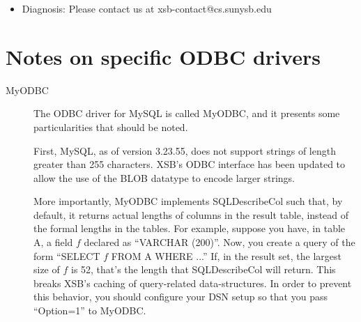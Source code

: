 \begin{description}
\begin{itemize}
\item Diagnosis: Please contact us at xsb-contact@cs.sunysb.edu
\end{itemize}

\section{Notes on specific ODBC drivers}

\begin{description}
\item[MyODBC] The ODBC driver for MySQL is called MyODBC, and it
  presents some particularities that should be noted. 

  First, MySQL, as
  of version 3.23.55, does not support strings of length greater than
  255 characters. XSB's ODBC interface has been updated to allow the
  use of the BLOB datatype to encode larger strings. 
  
  More importantly, MyODBC implements SQLDescribeCol such that, by
  default, it returns actual lengths of columns in the result table,
  instead of the formal lengths in the tables. For example, suppose
  you have, in table A, a field $f$ declared as ``VARCHAR
  (200)''. Now, you create a query of the form ``SELECT $f$ FROM A
  WHERE ...'' If, in the result set, the largest size of $f$ is 52,
  that's the length that SQLDescribeCol will return. This breaks XSB's
  caching of query-related data-structures. In order to prevent this
  behavior, you should configure your DSN setup so that you pass
  ``Option=1'' to MyODBC.

\end{description}


\end{description}

